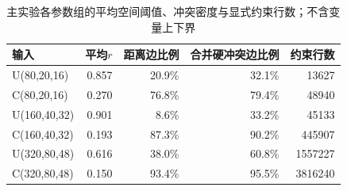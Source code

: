 \begin{table}[htbp]
\centering\small
\caption{主实验各参数组的平均空间阈值、冲突密度与显式约束行数；不含变量上下界}\label{tab:geometry}
\begin{tabular}{lrrrr}\toprule
输入 & 平均$r$ & 距离边比例 & 合并硬冲突边比例 & 约束行数 \\\midrule
U(80,20,16) & 0.857 & 20.9\% & 32.1\% & 13627 \\
C(80,20,16) & 0.270 & 76.8\% & 79.4\% & 48940 \\
U(160,40,32) & 0.901 & 8.6\% & 33.2\% & 45133 \\
C(160,40,32) & 0.193 & 87.3\% & 90.2\% & 445907 \\
U(320,80,48) & 0.616 & 38.0\% & 60.8\% & 1557227 \\
C(320,80,48) & 0.150 & 93.4\% & 95.5\% & 3816240 \\
\bottomrule\end{tabular}
\end{table}
